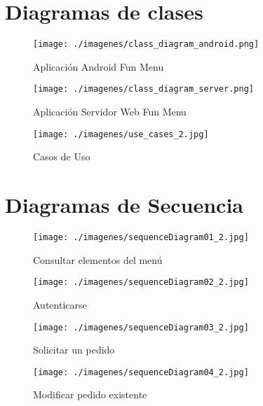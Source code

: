 \documentclass[letterpaper,12pt]{book}
\begin{document}
\begin{mainmatter}
\section{Diagramas de clases}


\begin{landscape}
 \begin{figure}
  \texttt{[image: ./imagenes/class\_diagram\_android.png]}
  \caption{Aplicación Android Fun Menu}
 \end{figure}

\end{landscape}


 

\begin{landscape}
 \begin{figure}
  \texttt{[image: ./imagenes/class\_diagram\_server.png]}
  \caption{Aplicación Servidor Web Fun Menu}
 \end{figure}

\end{landscape}



\begin{figure}
  \texttt{[image: ./imagenes/use\_cases\_2.jpg]}
  \caption{Casos de Uso}
\end{figure}




\section{Diagramas de Secuencia}
 
\begin{landscape}
 \begin{figure}
  \texttt{[image: ./imagenes/sequenceDiagram01\_2.jpg]}
  \caption{Consultar elementos del menú}
 \end{figure}
\end{landscape}


\begin{landscape}
 \begin{figure}
  \texttt{[image: ./imagenes/sequenceDiagram02\_2.jpg]}
  \caption{Autenticarse}
 \end{figure}
\end{landscape}


\begin{figure}
  \texttt{[image: ./imagenes/sequenceDiagram03\_2.jpg]}
  \caption{Solicitar un pedido}
\end{figure}


\begin{landscape}
 \begin{figure}
  \texttt{[image: ./imagenes/sequenceDiagram04\_2.jpg]}
  \caption{Modificar pedido existente}
 \end{figure}
\end{landscape}





\end{mainmatter}
\end{document}
